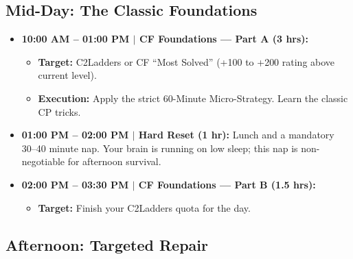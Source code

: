 \documentclass[12pt, a4paper]{article}
\begin{document}
\subsection{Mid-Day: The Classic Foundations}

\begin{itemize}[leftmargin=2em, itemsep=6pt]

  \item \textbf{10:00 AM -- 01:00 PM $|$ CF Foundations --- Part A (3 hrs):}
    \begin{itemize}
      \item \textbf{Target:} C2Ladders or CF ``Most Solved''
            (+100 to +200 rating above current level).
      \item \textbf{Execution:} Apply the strict 60-Minute Micro-Strategy.
            Learn the classic CP tricks.
    \end{itemize}

  \item \textbf{01:00 PM -- 02:00 PM $|$ Hard Reset (1 hr):} Lunch and a
        mandatory 30--40 minute nap. Your brain is running on low sleep; this
        nap is non-negotiable for afternoon survival.

  \item \textbf{02:00 PM -- 03:30 PM $|$ CF Foundations --- Part B (1.5 hrs):}
    \begin{itemize}
      \item \textbf{Target:} Finish your C2Ladders quota for the day.
    \end{itemize}

\end{itemize}

\subsection{Afternoon: Targeted Repair}
\end{document}
